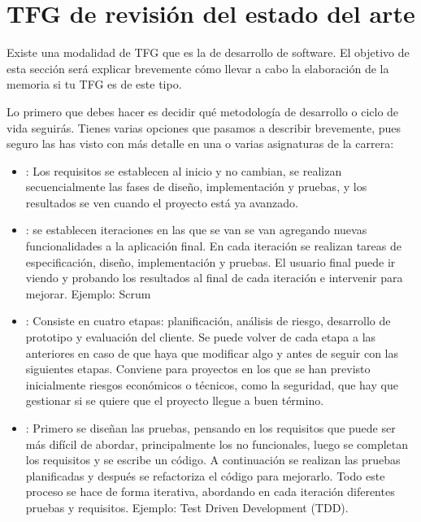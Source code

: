\section{TFG de revisión del estado del arte}

Existe una modalidad de TFG que es la de desarrollo de software. El objetivo de esta sección será explicar brevemente cómo llevar a cabo la elaboración de la memoria si tu TFG es de este tipo.

Lo primero que debes hacer es decidir qué metodología de desarrollo o ciclo de vida seguirás. Tienes varias opciones que pasamos a describir brevemente, pues seguro las has visto con más detalle en una o varias asignaturas de la carrera: 
\begin{itemize}
    \item {}: Los requisitos se establecen al inicio y no cambian, se realizan secuencialmente las fases de diseño, implementación y pruebas, y los resultados se ven cuando el proyecto está ya avanzado. 
     \item {}: se establecen iteraciones en las que se van se van agregando nuevas funcionalidades a la aplicación final. En cada iteración se realizan tareas de especificación, diseño, implementación y pruebas. El usuario final puede ir viendo y probando los resultados al final de cada iteración e intervenir para mejorar. Ejemplo: Scrum
     \item {}: Consiste en cuatro etapas: planificación, análisis de riesgo, desarrollo de prototipo y evaluación del cliente. Se puede volver de cada etapa a las anteriores en caso de que haya que modificar algo y antes de seguir con las siguientes etapas. Conviene para proyectos en los que se han previsto inicialmente riesgos económicos o técnicos, como la seguridad, que hay que gestionar si se quiere que el proyecto llegue a buen término.
     \item {}: Primero se diseñan las pruebas, pensando en los requisitos que puede ser más difícil de abordar, principalmente los no funcionales, luego se completan los requisitos y se escribe un código. A continuación se realizan las pruebas planificadas y después se refactoriza el código para mejorarlo. Todo este proceso se hace de forma iterativa, abordando en cada iteración diferentes pruebas y requisitos. Ejemplo: Test Driven Development (TDD).

\end{itemize}


